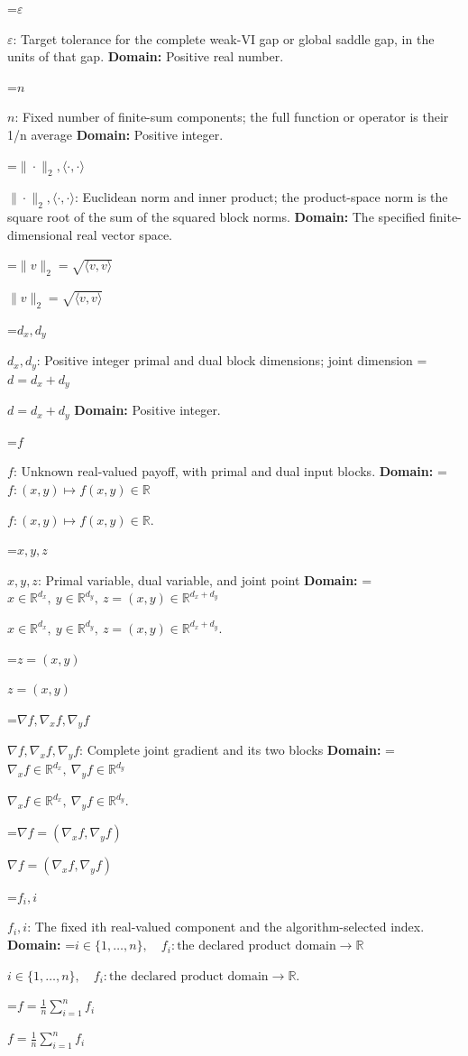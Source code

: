 \documentclass[10pt,a4paper]{article}
\newcommand{\AtlasMath}[1]{\par\begingroup\centering\setbox0=\hbox{$\displaystyle #1$}\ifdim\wd0>1.4\linewidth\typeout{ATLAS WIDE FORMULA: \the\wd0}\fi\ifdim\wd0>\linewidth\resizebox{\linewidth}{!}{\box0}\else\box0\fi\par\endgroup}
\newcommand{\AtlasInlineMath}[1]{\begingroup\setbox0=\hbox{$#1$}\ifdim\wd0>.4\linewidth\endgroup\AtlasMath{#1}\else\endgroup$#1$\fi}
\begin{document}
\AtlasInlineMath{\varepsilon}: Target tolerance for the complete weak-VI gap or global saddle gap, in the units of that gap. \textbf{Domain:} Positive real number.



\AtlasInlineMath{n}: Fixed number of finite-sum components; the full function or operator is their 1/n average \textbf{Domain:} Positive integer.



\AtlasInlineMath{\|\cdot\|_2,\langle\cdot,\cdot\rangle}: Euclidean norm and inner product; the product-space norm is the square root of the sum of the squared block norms. \textbf{Domain:} The specified finite-dimensional real vector space.



\AtlasInlineMath{\|v\|_2=\sqrt{\langle v,v\rangle}}



\AtlasInlineMath{d_x,d_y}: Positive integer primal and dual block dimensions; joint dimension \AtlasInlineMath{d=d_x+d_y} \textbf{Domain:} Positive integer.



\AtlasInlineMath{f}: Unknown real-valued payoff, with primal and dual input blocks. \textbf{Domain:} \AtlasInlineMath{f:(x,y)\mapsto f(x,y)\in\mathbb R}.



\AtlasInlineMath{x,y,z}: Primal variable, dual variable, and joint point \textbf{Domain:} \AtlasInlineMath{x\in\mathbb R^{d_x},\ y\in\mathbb R^{d_y},\ z=(x,y)\in\mathbb R^{d_x+d_y}}.



\AtlasInlineMath{z=(x,y)}



\AtlasInlineMath{\nabla f,\nabla_x f,\nabla_y f}: Complete joint gradient and its two blocks \textbf{Domain:} \AtlasInlineMath{\nabla_x f\in\mathbb R^{d_x},\ \nabla_y f\in\mathbb R^{d_y}}.



\AtlasInlineMath{\nabla f=(\nabla_x f,\nabla_y f)}



\AtlasInlineMath{f_i,i}: The fixed ith real-valued component and the algorithm-selected index. \textbf{Domain:} \AtlasInlineMath{i\in\{1,\ldots,n\},\quad f_i:\text{the declared product domain}\to\mathbb R}.



\AtlasInlineMath{f=\frac1n\sum_{i=1}^n f_i}
\end{document}

